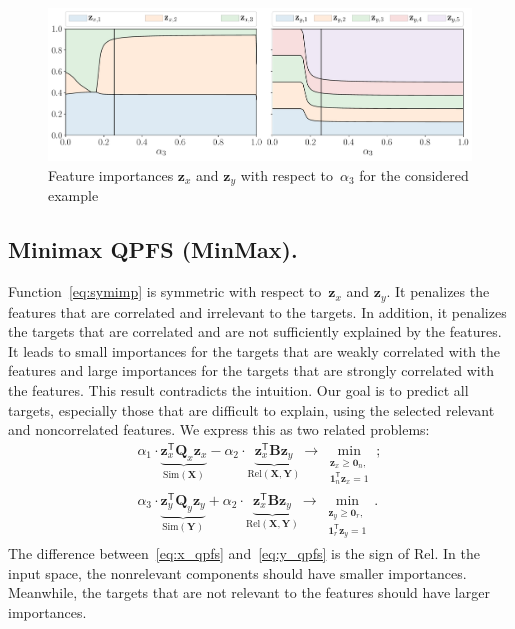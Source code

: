 \documentclass[12pt,twoside]{article}
\theoremstyle{definition}
\newcommand{\bz}{\mathbf{z}}
\newcommand{\bY}{\mathbf{Y}}
\newcommand{\bX}{\mathbf{X}}
\newcommand{\bQ}{\mathbf{Q}}
\newcommand{\T}{\mathsf{T}}
\newcommand{\bOne}{\boldsymbol{1}}
\newcommand{\bZero}{\boldsymbol{0}}
\begin{document}
\begin{figure}
	\centering
	\includegraphics[width=\linewidth]{figs/features_vs_alpha.pdf}
	\caption{Feature importances $\bz_x$ and $\bz_y$ with respect to~$\alpha_3$ for the considered example}
	\label{fig:features_vs_alpha}
\end{figure}

\subsection{Minimax QPFS (MinMax).}
Function~\eqref{eq:symimp} is symmetric with respect to~$\bz_x$ and $\bz_y$.
It penalizes the features that are correlated and irrelevant to the targets.
In addition, it penalizes the targets that are correlated and are not sufficiently explained by the features.
It leads to small importances for the targets that are weakly correlated with the features and large importances for the targets that are strongly correlated with the features.
This result contradicts the intuition.
Our goal is to predict all targets, especially those that are difficult to explain, using the selected relevant and noncorrelated features. We express this as two related problems:
\begin{align}
\alpha_1 \cdot \underbrace{\bz_x^{\T} \bQ_x \bz_x}_{\text{Sim}(\bX)} - \alpha_2 \cdot \underbrace{ \bz_x^{\T}\mathbf{B} \bz_y}_{\text{Rel}(\bX, \bY)} \rightarrow \min_{\substack{\bz_x \geq \bZero_n, \\ \bOne_n^{\T}\bz_x=1}};
\label{eq:x_qpfs}\\
\alpha_3 \cdot \underbrace{\bz_y^{\T} \bQ_y \bz_y}_{\text{Sim}(\bY)} + \alpha_2 \cdot \underbrace{ \bz_x^{\T} \mathbf{B} \bz_y}_{\text{Rel}(\bX, \bY)} \rightarrow \min_{\substack{\bz_y \geq \bZero_r,  \\ \bOne_r^{\T}\bz_y=1}}.
\label{eq:y_qpfs}
\end{align}
The difference between~\eqref{eq:x_qpfs} and~\eqref{eq:y_qpfs} is the sign of Rel.
In the input space, the nonrelevant components should have smaller importances.
Meanwhile, the targets that are not relevant to the features should have larger importances.
\end{document}

